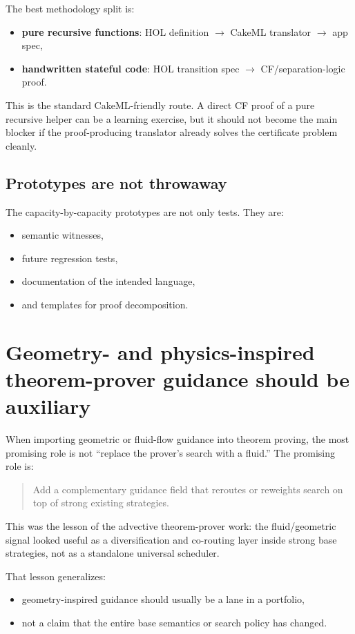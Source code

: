 \documentclass[11pt]{article}
\begin{document}
The best methodology split is:
\begin{itemize}
    \item \textbf{pure recursive functions}: HOL definition \(\to\) CakeML translator \(\to\) app spec,
    \item \textbf{handwritten stateful code}: HOL transition spec \(\to\) CF/separation-logic proof.
\end{itemize}

This is the standard CakeML-friendly route. A direct CF proof of a pure recursive helper can be a learning exercise, but it should not become the main blocker if the proof-producing translator already solves the certificate problem cleanly.

\subsection{Prototypes are not throwaway}

The capacity-by-capacity prototypes are not only tests. They are:
\begin{itemize}
    \item semantic witnesses,
    \item future regression tests,
    \item documentation of the intended language,
    \item and templates for proof decomposition.
\end{itemize}

\section{Geometry- and physics-inspired theorem-prover guidance should be auxiliary}

When importing geometric or fluid-flow guidance into theorem proving, the most promising role is not ``replace the prover's search with a fluid.'' The promising role is:

\begin{quote}
Add a complementary guidance field that reroutes or reweights search on top of strong existing strategies.
\end{quote}

This was the lesson of the advective theorem-prover work: the fluid/geometric signal looked useful as a diversification and co-routing layer inside strong base strategies, not as a standalone universal scheduler.

That lesson generalizes:
\begin{itemize}
    \item geometry-inspired guidance should usually be a lane in a portfolio,
    \item not a claim that the entire base semantics or search policy has changed.
\end{itemize}
\end{document}
